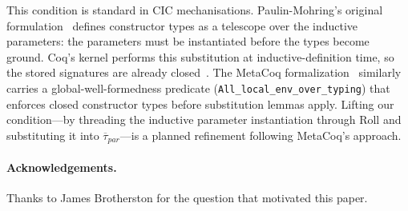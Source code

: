 \documentclass[runningheads]{llncs}
\begin{document}
This condition is standard in CIC mechanisations.
Paulin-Mohring's original formulation~\cite{paulin-mohring-1993-inductive}
defines constructor types as a telescope over the inductive parameters:
the parameters must be instantiated before the types become ground.
Coq's kernel performs this substitution at inductive-definition time,
so the stored signatures are already closed~\cite{barras-2010-coq-sets}.
The MetaCoq formalization~\cite{sozeau-etal-2020-metacoq,sozeau-etal-2023-metacoq-jar}
similarly carries a global-well-formedness predicate
(\texttt{All\_local\_env\_over\_typing}) that enforces closed constructor
types before substitution lemmas apply.
Lifting our condition---by threading the inductive parameter
instantiation through Roll and substituting it into
$\overline{\tau}_{\!\textit{par}}$---is a planned refinement following
MetaCoq's approach.

\paragraph{Acknowledgements.}
Thanks to James Brotherston for the question that motivated this paper.



\end{document}
